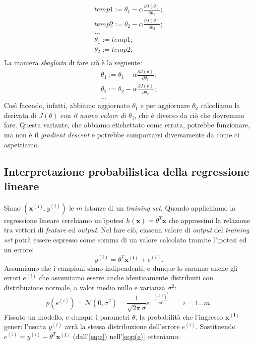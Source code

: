 \begin{gather*}
temp1 := \theta_1 - \alpha \frac{ \partial J(\theta)}{ \partial \theta_1}; \\
temp2 := \theta_2 - \alpha \frac{ \partial J(\theta)}{ \partial \theta_2}; \\
\dots \\
\theta_1 := temp1; \\
\theta_2 := temp2;\\
\end{gather*}
La maniera \emph{sbagliata} di fare ciò è la seguente:
\begin{gather*}
\theta_1 := \theta_1 -\alpha \frac{ \partial J(\theta)}{ \partial \theta_1}; \\
\theta_2 := \theta_2 - \alpha \frac{ \partial J(\theta)}{ \partial \theta_2}; \\
\dots
\end{gather*}
Così facendo, infatti, abbiamo aggiornato $\theta_1$ e per aggiornare $\theta_2$ calcoliamo la derivata di $J(\theta)$ con \emph{il nuovo valore di $\theta_1$}, che è diverso da ciò che dovremmo fare. Questa variante, che abbiamo etichettato come errata, potrebbe funzionare, ma non è il \emph{gradient descent} e potrebbe comportarsi diversamente da come ci aspettiamo.

\subsection{Interpretazione probabilistica della regressione lineare}

Siano $(\mathbf{x^{(i)}},y^{(i)})$ le $m$ istanze di un \emph{training set}. Quando applichiamo la regressione lineare cerchiamo un'ipotesi $ h(\mathbf{x}) = \theta^T \mathbf{x}$ che approssimi la relazione tra vettori di \emph{feature} ed \emph{output}. Nel fare ciò, ciascun valore di \emph{output} del \emph{training set} potrà essere espresso come somma di un valore calcolato tramite l'ipotesi ed un errore: \begin{equation}\label{eq:e}
   y^{(i)}=\theta^T \mathbf{x^{(i)}}+e^{(i)}.
 \end{equation}
 Assumiamo che i campioni siano indipendenti, e dunque lo saranno anche gli errori $e^{(i)}$ che assumiamo essere anche identicamente distribuiti con distribuzione normale, a valor medio nullo e varianza $\sigma^2$: 
 \begin{equation}\label{eqp(e)}
  p(e^{(i)}) = \mathcal{N}(0, \sigma^2) = \frac{1}{\sqrt{2 \pi} \sigma } e ^{-\frac{(e^{(i)})^2}{2 \sigma^2}} \qquad i=1 \dots m.\end{equation}   
Fissato un modello, e dunque i parametri $\theta$, la probabilità che l'ingresso $\mathbf{x^{(i)}}$ generi l'uscita $y^{(i)}$ avrà la stessa distribuzione dell'errore $e^{(i)}$. Sostituendo $e^{(i)}=y^{(i)}- \theta^T \mathbf{x^{(i)}}$ (dall'\autoref{eq:e}) nell'\autoref{eqp(e)} otteniamo:

